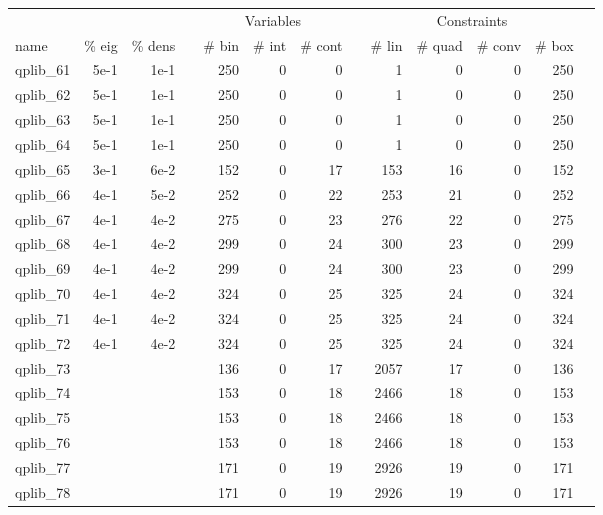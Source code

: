 \begin{table}
 \centering
 \setlength{\tabcolsep}{7pt}
 \renewcommand \arraystretch{1}
\begin{tabular}{lrrrrrrrrrrrr}
\toprule

	&		&		&	&	\multicolumn{3}{c}{Variables}					&	&	\multicolumn{4}{c}{Constraints}							\\
\cmidrule(lr){5-7} \cmidrule(lr){9-12}							 														
name	&	\% eig	&	\% dens	&	&	\# bin	&	\# int 	&	\# cont 	&	&	\# lin 	&	\# quad 	&	\# conv 	&	\# box	\\
\cmidrule(lr){5-7} \cmidrule(lr){9-12}																					
qplib\_61	&	5e-1	&	1e-1	&	&	250	&	0	&	0	&	&	1	&	0	&	0	&	250	\\
qplib\_62	&	5e-1	&	1e-1	&	&	250	&	0	&	0	&	&	1	&	0	&	0	&	250	\\
qplib\_63	&	5e-1	&	1e-1	&	&	250	&	0	&	0	&	&	1	&	0	&	0	&	250	\\
qplib\_64	&	5e-1	&	1e-1	&	&	250	&	0	&	0	&	&	1	&	0	&	0	&	250	\\
qplib\_65	&	3e-1	&	6e-2	&	&	152	&	0	&	17	&	&	153	&	16	&	0	&	152	\\
qplib\_66	&	4e-1	&	5e-2	&	&	252	&	0	&	22	&	&	253	&	21	&	0	&	252	\\
qplib\_67	&	4e-1	&	4e-2	&	&	275	&	0	&	23	&	&	276	&	22	&	0	&	275	\\
qplib\_68	&	4e-1	&	4e-2	&	&	299	&	0	&	24	&	&	300	&	23	&	0	&	299	\\
qplib\_69	&	4e-1	&	4e-2	&	&	299	&	0	&	24	&	&	300	&	23	&	0	&	299	\\
qplib\_70	&	4e-1	&	4e-2	&	&	324	&	0	&	25	&	&	325	&	24	&	0	&	324	\\
qplib\_71	&	4e-1	&	4e-2	&	&	324	&	0	&	25	&	&	325	&	24	&	0	&	324	\\
qplib\_72	&	4e-1	&	4e-2	&	&	324	&	0	&	25	&	&	325	&	24	&	0	&	324	\\
qplib\_73	&		&		&	&	136	&	0	&	17	&	&	2057	&	17	&	0	&	136	\\
qplib\_74	&		&		&	&	153	&	0	&	18	&	&	2466	&	18	&	0	&	153	\\
qplib\_75	&		&		&	&	153	&	0	&	18	&	&	2466	&	18	&	0	&	153	\\
qplib\_76	&		&		&	&	153	&	0	&	18	&	&	2466	&	18	&	0	&	153	\\
qplib\_77	&		&		&	&	171	&	0	&	19	&	&	2926	&	19	&	0	&	171	\\
qplib\_78	&		&		&	&	171	&	0	&	19	&	&	2926	&	19	&	0	&	171	\\

\end{tabular}
\end{table}
